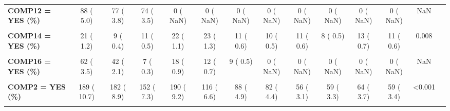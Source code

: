 \documentclass[
]{article}
\begin{document}
\begin{table}[H]
\begin{tabular}[t]{>{\raggedright\arraybackslash}p{5em}ccccccccccccc}
\textbf{COMP12 = YES (\%)} & 88 (  5.0) & 77 (  3.8) & 74 (  3.5) & 0 (  NaN) & 0 (  NaN) & 0 (  NaN) & 0 (  NaN) & 0 (  NaN) & 0 (  NaN) & 0 (  NaN) & 0 (  NaN) & NaN & \\
\textbf{\cellcolor{gray!10}{COMP13 = YES (\%)}} & \cellcolor{gray!10}{64 (  3.6)} & \cellcolor{gray!10}{49 (  2.4)} & \cellcolor{gray!10}{26 (  1.2)} & \cellcolor{gray!10}{52 (  2.5)} & \cellcolor{gray!10}{21 (  1.2)} & \cellcolor{gray!10}{34 (  1.9)} & \cellcolor{gray!10}{22 (  1.2)} & \cellcolor{gray!10}{23 (  1.3)} & \cellcolor{gray!10}{23 (  1.3)} & \cellcolor{gray!10}{25 (  1.4)} & \cellcolor{gray!10}{21 (  1.2)} & \cellcolor{gray!10}{<0.001} & \cellcolor{gray!10}{}\\
\textbf{COMP14 = YES (\%)} & 21 (  1.2) & 9 (  0.4) & 11 (  0.5) & 22 (  1.1) & 23 (  1.3) & 11 (  0.6) & 10 (  0.5) & 11 (  0.6) & 8 (  0.5) & 13 (  0.7) & 11 (  0.6) & 0.008 & \\
\textbf{\cellcolor{gray!10}{COMP15 = YES (\%)}} & \cellcolor{gray!10}{120 (  6.8)} & \cellcolor{gray!10}{81 (  4.0)} & \cellcolor{gray!10}{10 (  0.5)} & \cellcolor{gray!10}{39 (  1.9)} & \cellcolor{gray!10}{23 (  1.3)} & \cellcolor{gray!10}{31 (  1.7)} & \cellcolor{gray!10}{0 (  NaN)} & \cellcolor{gray!10}{0 (  NaN)} & \cellcolor{gray!10}{0 (  NaN)} & \cellcolor{gray!10}{0 (  NaN)} & \cellcolor{gray!10}{0 (  NaN)} & \cellcolor{gray!10}{NaN} & \cellcolor{gray!10}{}\\
\textbf{COMP16 = YES (\%)} & 62 (  3.5) & 42 (  2.1) & 7 (  0.3) & 18 (  0.9) & 12 (  0.7) & 9 (  0.5) & 0 (  NaN) & 0 (  NaN) & 0 (  NaN) & 0 (  NaN) & 0 (  NaN) & NaN & \\
\textbf{\cellcolor{gray!10}{COMP19 = YES (\%)}} & \cellcolor{gray!10}{3 (  0.2)} & \cellcolor{gray!10}{1 (  0.0)} & \cellcolor{gray!10}{5 (  0.2)} & \cellcolor{gray!10}{1 (  0.0)} & \cellcolor{gray!10}{6 (  0.3)} & \cellcolor{gray!10}{3 (  0.2)} & \cellcolor{gray!10}{1 (  0.1)} & \cellcolor{gray!10}{1 (  0.1)} & \cellcolor{gray!10}{0 (  0.0)} & \cellcolor{gray!10}{0 (  0.0)} & \cellcolor{gray!10}{0 (  0.0)} & \cellcolor{gray!10}{0.012} & \cellcolor{gray!10}{}\\
\textbf{COMP2 = YES (\%)} & 189 ( 10.7) & 182 (  8.9) & 152 (  7.3) & 190 (  9.2) & 116 (  6.6) & 88 (  4.9) & 82 (  4.4) & 56 (  3.1) & 59 (  3.3) & 64 (  3.7) & 59 (  3.4) & <0.001 & \\
\textbf{\cellcolor{gray!10}{COMP20 = YES (\%)}} & \cellcolor{gray!10}{65 (  3.7)} & \cellcolor{gray!10}{47 (  2.3)} & \cellcolor{gray!10}{15 (  0.7)} & \cellcolor{gray!10}{67 (  3.2)} & \cellcolor{gray!10}{28 (  1.6)} & \cellcolor{gray!10}{30 (  1.7)} & \cellcolor{gray!10}{40 (  2.1)} & \cellcolor{gray!10}{20 (  1.1)} & \cellcolor{gray!10}{15 (  0.8)} & \cellcolor{gray!10}{31 (  1.8)} & \cellcolor{gray!10}{25 (  1.4)} & \cellcolor{gray!10}{<0.001} & \cellcolor{gray!10}{}\\

\end{tabular}
\end{table}
\end{document}
